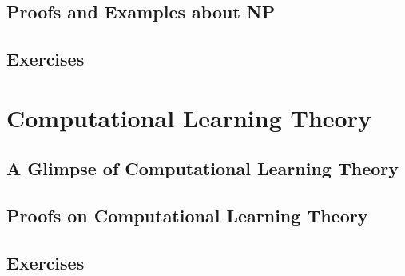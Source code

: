 \documentclass{article}
\begin{document}
		\subsection{Proofs and Examples about NP}
		\subsection{Exercises}

	\cleardoublepage
	\section{Computational Learning Theory}
		\subsection{A Glimpse of Computational Learning Theory}
		\subsection{Proofs on Computational Learning Theory}
		\subsection{Exercises}
\end{document}
